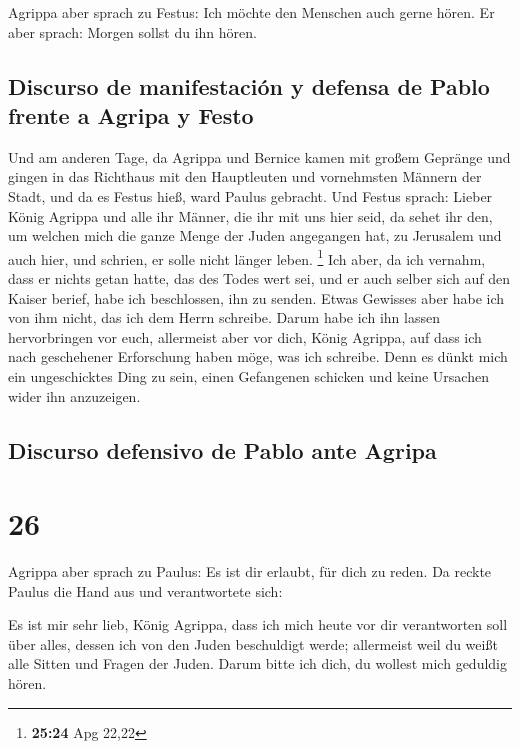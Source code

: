  Agrippa aber sprach zu Festus: Ich möchte den Menschen
auch gerne hören. Er aber sprach: Morgen sollst du ihn hören.

\hypertarget{discurso-de-manifestaciuxf3n-y-defensa-de-pablo-frente-a-agripa-y-festo}{%
\subsection{Discurso de manifestación y defensa de Pablo frente a Agripa
y
Festo}\label{discurso-de-manifestaciuxf3n-y-defensa-de-pablo-frente-a-agripa-y-festo}}

 Und am anderen Tage, da Agrippa und Bernice kamen mit
großem Gepränge und gingen in das Richthaus mit den Hauptleuten und
vornehmsten Männern der Stadt, und da es Festus hieß, ward Paulus
gebracht.  Und Festus sprach: Lieber König Agrippa und
alle ihr Männer, die ihr mit uns hier seid, da sehet ihr den, um welchen
mich die ganze Menge der Juden angegangen hat, zu Jerusalem und auch
hier, und schrien, er solle nicht länger leben. \footnote{\textbf{25:24}
  Apg 22,22}  Ich aber, da ich vernahm, dass er nichts
getan hatte, das des Todes wert sei, und er auch selber sich auf den
Kaiser berief, habe ich beschlossen, ihn zu senden. 
Etwas Gewisses aber habe ich von ihm nicht, das ich dem Herrn schreibe.
Darum habe ich ihn lassen hervorbringen vor euch, allermeist aber vor
dich, König Agrippa, auf dass ich nach geschehener Erforschung haben
möge, was ich schreibe.  Denn es dünkt mich ein
ungeschicktes Ding zu sein, einen Gefangenen schicken und keine Ursachen
wider ihn anzuzeigen.

\hypertarget{discurso-defensivo-de-pablo-ante-agripa}{%
\subsection{Discurso defensivo de Pablo ante
Agripa}\label{discurso-defensivo-de-pablo-ante-agripa}}

\hypertarget{section-25}{%
\section{26}\label{section-25}}

 Agrippa aber sprach zu Paulus: Es ist dir erlaubt, für
dich zu reden. Da reckte Paulus die Hand aus und verantwortete sich:

 Es ist mir sehr lieb, König Agrippa, dass ich mich heute
vor dir verantworten soll über alles, dessen ich von den Juden
beschuldigt werde;  allermeist weil du weißt alle Sitten
und Fragen der Juden. Darum bitte ich dich, du wollest mich geduldig
hören.

